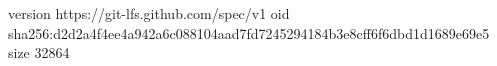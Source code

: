 version https://git-lfs.github.com/spec/v1
oid sha256:d2d2a4f4ee4a942a6c088104aad7fd7245294184b3e8cff6f6dbd1d1689e69e5
size 32864

